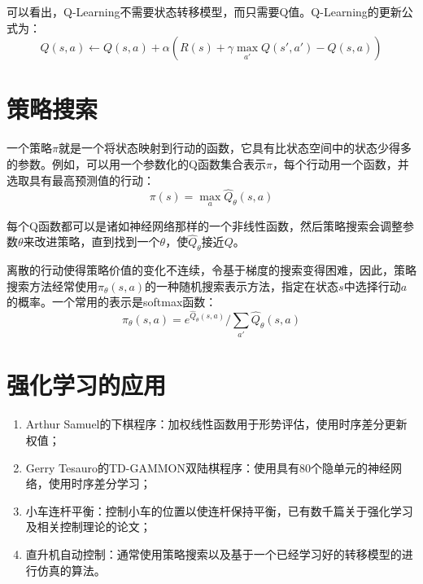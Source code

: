 \documentclass[a4paper]{ctexart}
\begin{document}
可以看出，Q-Learning不需要状态转移模型，而只需要Q值。Q-Learning的更新公式为：
$$Q(s,a)\leftarrow Q(s,a)+\alpha(R(s)+\gamma\mathop{max}\limits_{a'}Q(s',a')-Q(s,a))$$

\section{策略搜索}

一个策略$\pi$就是一个将状态映射到行动的函数，它具有比状态空间中的状态少得多的参数。例如，可以用一个参数化的Q函数集合表示$\pi$，每个行动用一个函数，并选取具有最高预测值的行动：
$$\pi(s)=\mathop{max}\limits_a\hat{Q}_\theta(s,a)$$

每个Q函数都可以是诸如神经网络那样的一个非线性函数，然后策略搜索会调整参数$\theta$来改进策略，直到找到一个$\theta$，使$\hat{Q}_\theta$接近$Q$。

离散的行动使得策略价值的变化不连续，令基于梯度的搜索变得困难，因此，策略搜索方法经常使用$\pi_\theta(s,a)$的一种随机搜索表示方法，指定在状态$s$中选择行动$a$的概率。一个常用的表示是softmax函数：
$$\pi_\theta(s,a)=e^{\hat{Q}_\theta(s,a)}/\sum_{a'}\hat{Q}_\theta(s,a)$$

\section{强化学习的应用}

\begin{enumerate}[label=\arabic*、]
	\item Arthur Samuel的下棋程序：加权线性函数用于形势评估，使用时序差分更新权值；
	\item Gerry Tesauro的TD-GAMMON双陆棋程序：使用具有80个隐单元的神经网络，使用时序差分学习；
	\item 小车连杆平衡：控制小车的位置以使连杆保持平衡，已有数千篇关于强化学习及相关控制理论的论文；
	\item 直升机自动控制：通常使用策略搜索以及基于一个已经学习好的转移模型的进行仿真的算法。
\end{enumerate}
\end{document}
